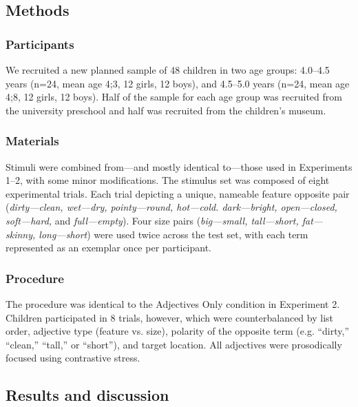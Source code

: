\documentclass[man]{apa2}
\begin{document}
\subsection{Methods}

\subsubsection{Participants}

We recruited a new planned sample of 48 children in two age groups: 4.0--4.5 years (n=24, mean age 4;3, 12 girls, 12 boys), and 4.5--5.0 years (n=24, mean age 4;8, 12 girls, 12 boys).  Half of the sample for each age group was recruited from the university preschool and half was recruited from the children's museum.

\subsubsection{Materials}

Stimuli were combined from---and mostly identical to---those used in Experiments 1--2, with some minor modifications. The stimulus set was composed of eight experimental trials.  Each trial depicting a unique, nameable feature opposite pair (\emph{dirty---clean, wet---dry, pointy---round, hot---cold. dark---bright, open---closed, soft---hard,} and \emph{full---empty}). Four size pairs (\emph{big---small, tall---short, fat---skinny, long---short}) were used twice across the test set, with each term represented as an exemplar once per participant.  

\subsubsection{Procedure}

The procedure was identical to the Adjectives Only condition in Experiment 2. Children participated in 8 trials, however, which were counterbalanced by list order, adjective type (feature vs. size), polarity of the opposite term (e.g. ``dirty,'' ``clean,'' ``tall,'' or ``short''), and target location. All adjectives were prosodically focused using contrastive stress. 

\subsection{Results and discussion}
\end{document}
